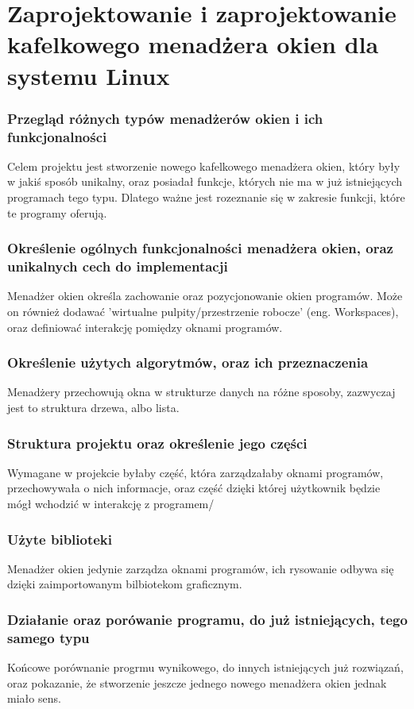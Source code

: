 \documentclass[12pt]{article}
\begin{document}
\tabelka


\section*{Zaprojektowanie i zaprojektowanie kafelkowego menadżera okien dla systemu Linux}

\subsubsection{Przegląd różnych typów menadżerów okien i ich funkcjonalności}
Celem projektu jest stworzenie nowego kafelkowego menadżera okien, który były w jakiś sposób unikalny, oraz posiadał funkcje, których nie ma w już istniejących programach tego typu. Dlatego ważne jest rozeznanie się w zakresie funkcji, które te programy oferują.
\\

\subsubsection{Określenie ogólnych funkcjonalności menadżera okien, oraz unikalnych cech do implementacji}
Menadżer okien określa zachowanie oraz pozycjonowanie okien programów. Może on również dodawać 'wirtualne pulpity/przestrzenie robocze' (eng. Workspaces), oraz definiować interakcję pomiędzy oknami programów.
\\
\subsubsection{Określenie użytych algorytmów, oraz ich przeznaczenia}
Menadżery przechowują okna w strukturze danych na różne sposoby, zazwyczaj jest to struktura drzewa, albo lista.
\\
\subsubsection{Struktura projektu oraz określenie jego części}
Wymagane w projekcie byłaby część, która zarządzałaby oknami programów, przechowywała o nich informacje, oraz część dzięki której użytkownik będzie mógł wchodzić w interakcję z programem/
\\
\subsubsection{Użyte biblioteki}
Menadżer okien jedynie zarządza oknami programów, ich rysowanie odbywa się dzięki zaimportowanym bilbiotekom graficznym.
\\
\subsubsection{Działanie oraz porówanie programu, do już istniejących, tego samego typu}
Końcowe porównanie progrmu wynikowego, do innych istniejących już rozwiązań, oraz pokazanie, że stworzenie jeszcze jednego nowego menadżera okien jednak miało sens.\
\\
\end{document}
